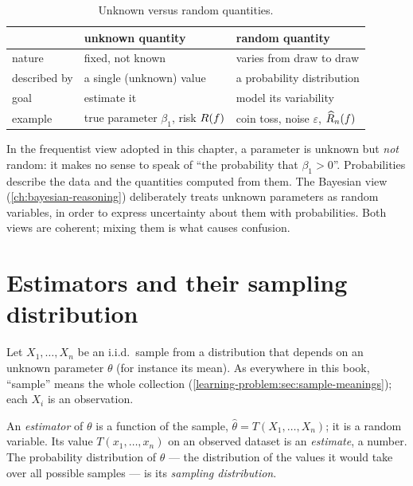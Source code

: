 \begin{notechapter}
\begin{table}[ht]
\centering
\caption{Unknown versus random quantities.}
\label{stats-and-proba:tab:unknown-random}
\begin{tabular}{@{}lll@{}}
\toprule
 & unknown quantity & random quantity \\
\midrule
nature & fixed, not known & varies from draw to draw \\
described by & a single (unknown) value & a probability distribution \\
goal & estimate it & model its variability \\
example & true parameter $\beta_1$, risk $R(f)$ & coin toss, noise $\varepsilon$, $\widehat{R}_n(f)$ \\
\bottomrule
\end{tabular}
\end{table}

\begin{pitfall}
In the frequentist view adopted in this chapter, a parameter is unknown but
\emph{not} random: it makes no sense to speak of ``the probability that
$\beta_1 > 0$''. Probabilities describe the data and the quantities computed
from them. The Bayesian view (\cref{ch:bayesian-reasoning}) deliberately treats
unknown parameters as random variables, in order to express uncertainty about
them with probabilities. Both views are coherent; mixing them is what causes
confusion.
\end{pitfall}

\section{Estimators and their sampling distribution}\label{stats-and-proba:sec:estimators}

Let $X_1,\dots,X_n$ be an i.i.d.\ sample from a distribution that depends on
an unknown parameter $\theta$ (for instance its mean). As everywhere in this book, ``sample'' means the whole
collection (\cref{learning-problem:sec:sample-meanings}); each $X_i$ is an
observation.

\begin{definition}
An \emph{estimator} of $\theta$ is a function of the sample,
$\hat\theta = T(X_1,\dots,X_n)$; it is a random variable. Its value
$T(x_1,\dots,x_n)$ on an observed dataset is an \emph{estimate}, a number. The
probability distribution of $\hat\theta$ --- the distribution of the values it
would take over all possible samples --- is its \emph{sampling distribution}.
\end{definition}


\end{notechapter}
